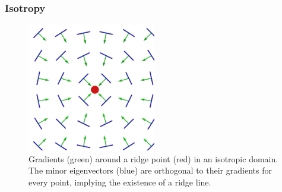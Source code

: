 \subsubsection{Isotropy}\label{sec:iso}

\begin{figure}
    \centering
    \includegraphics[width=0.5\textwidth]{Images/iso.png}
    \caption{Gradients (green) around a ridge point (red) in an isotropic
    domain. The minor eigenvectors (blue) are orthogonal to their
    gradients for every point, implying the existence of a ridge line.}
    \label{fig:iso}
\end{figure}

